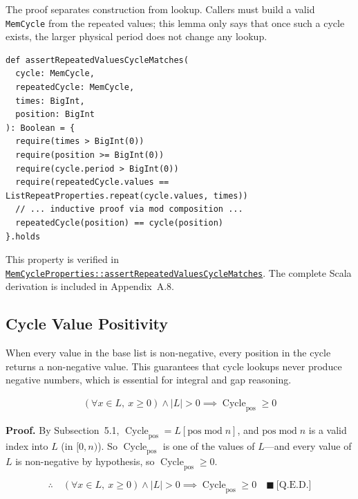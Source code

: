 The proof separates construction from lookup. Callers must build a valid
\texttt{MemCycle} from the repeated values; this lemma only says that once such
a cycle exists, the larger physical period does not change any lookup.

\begin{lstlisting}[style=scala]
def assertRepeatedValuesCycleMatches(
  cycle: MemCycle,
  repeatedCycle: MemCycle,
  times: BigInt,
  position: BigInt
): Boolean = {
  require(times > BigInt(0))
  require(position >= BigInt(0))
  require(cycle.period > BigInt(0))
  require(repeatedCycle.values == ListRepeatProperties.repeat(cycle.values, times))
  // ... inductive proof via mod composition ...
  repeatedCycle(position) == cycle(position)
}.holds
\end{lstlisting}

This property is verified in
\href{https://github.com/thiagomata/prime-numbers/blob/cycle-article-v1.0.0/src/main/scala/v1/chapter4/cycle/memory/properties/MemCycleProperties.scala}{\texttt{MemCycleProperties::assertRepeatedValuesCycleMatches}}.
The complete Scala derivation is included in Appendix~A.8.

\subsection{Cycle Value Positivity}

When every value in the base list is non-negative, every position in the cycle
returns a non-negative value. This guarantees that cycle lookups never produce
negative numbers, which is essential for integral and gap reasoning.

\begin{equation*}
\begin{aligned}
(\forall x\in L,\ x\geq 0)\land |L|>0
  \implies \operatorname{Cycle}_{\text{pos}}\geq 0
\end{aligned}
\end{equation*}

\noindent\textbf{Proof.} By Subsection~5.1,
$\operatorname{Cycle}_{\text{pos}}=L[\text{pos}\operatorname{mod}n]$, and
$\text{pos}\operatorname{mod}n$ is a valid index into $L$ (in $[0,n)$). So
$\operatorname{Cycle}_{\text{pos}}$ is one of the values of $L$---and every
value of $L$ is non-negative by hypothesis, so
$\operatorname{Cycle}_{\text{pos}}\geq 0$.

\begin{equation*}
\therefore\quad
(\forall x\in L,\ x\geq 0)\land |L|>0
  \implies \operatorname{Cycle}_{\text{pos}}\geq 0
  \quad \blacksquare\ \text{[Q.E.D.]}
\end{equation*}

